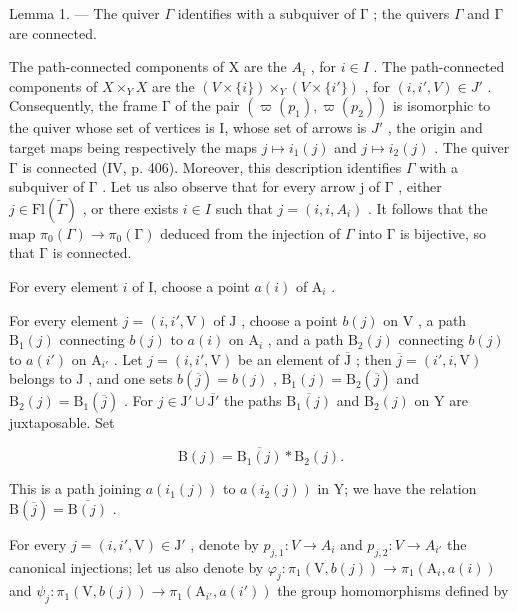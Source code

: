 Lemma 1. --- The quiver \(\Gamma\) identifies with a subquiver of \(\textsf{Γ}\) ; the quivers \(\Gamma\) and \(\textsf{Γ}\) are connected.

The path-connected components of X are the \(A_{i}\) , for \(i \in I\) . The path-connected components of \(X \times_{Y} X\) are the \((V \times \{i\}) \times_{Y} (V \times \{i'\})\) , for \((i, i', V) \in J'\) . Consequently, the frame \(\textsf{Γ}\) of the pair \((\varpi(p_1), \varpi(p_2))\) is isomorphic to the quiver whose set of vertices is I, whose set of arrows is \(J'\) , the origin and target maps being respectively the maps \(j \mapsto i_1(j)\) and \(j \mapsto i_2(j)\) . The quiver \(\textsf{Γ}\) is connected (IV, p. 406). Moreover, this description identifies \(\Gamma\) with a subquiver of \(\textsf{Γ}\) . Let us also observe that for every arrow j of \(\textsf{Γ}\) , either \(j \in \mathrm{Fl}(\widetilde{\Gamma})\) , or there exists \(i \in I\) such that \(j = (i, i, A_i)\) . It follows that the map \(\pi_0(\Gamma) \to \pi_0(\textsf{Γ})\) deduced from the injection of \(\Gamma\) into \(\textsf{Γ}\) is bijective, so that \(\textsf{Γ}\) is connected.

For every element \(i\) of I, choose a point \(a(i)\) of \(\mathrm{A}_i\) .

For every element \(j = (i, i', \mathrm{V})\) of \(\mathrm{J}\) , choose a point \(b(j)\) on \(\mathrm{V}\) , a path \(\mathrm{B}_1(j)\) connecting \(b(j)\) to \(a(i)\) on \(\mathrm{A}_i\) , and a path \(\mathrm{B}_2(j)\) connecting \(b(j)\) to \(a(i')\) on \(\mathrm{A}_{i'}\) . Let \(j = (i, i', \mathrm{V})\) be an element of \(\overline{\mathrm{J}}\) ; then \(\overline{j} = (i', i, \mathrm{V})\) belongs to \(\mathrm{J}\) , and one sets \(b(\overline{j}) = b(j)\) , \(\mathrm{B}_1(j) = \mathrm{B}_2(\overline{j})\) and \(\mathrm{B}_2(j) = \mathrm{B}_1(\overline{j})\) . For \(j \in \mathrm{J}' \cup \overline{\mathrm{J}'}\) the paths \(\overline{\mathrm{B}_1(j)}\) and \(\mathrm{B}_2(j)\) on \(\mathrm{Y}\) are juxtaposable. Set

\[
\mathrm{B} (j) = \overline {{\mathrm{B} _ {1} (j)}} * \mathrm{B} _ {2} (j).\tag{3}
\]

This is a path joining \(a(i_1(j))\) to \(a(i_2(j))\) in Y; we have the relation \(\mathrm{B}(\overline{j}) = \overline{\mathrm{B}(j)}\) .

For every \(j = (i, i', \mathrm{V}) \in \mathrm{J}'\) , denote by \(p_{j,1} \colon V \to A_i\) and \(p_{j,2} \colon V \to A_{i'}\) the canonical injections; let us also denote by \(\varphi_j \colon \pi_1(\mathrm{V}, b(j)) \to \pi_1(\mathrm{A}_i, a(i))\) and \(\psi_j \colon \pi_1(\mathrm{V}, b(j)) \to \pi_1(\mathrm{A}_{i'}, a(i'))\) the group homomorphisms defined by

